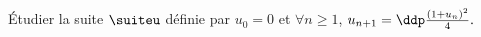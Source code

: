
\begin{exercice} \;
\'Etudier la suite $\suiteu$ d\'efinie par $u_0=0$ et $\forall n \geq 1$, $u_{n+1}=\ddp\frac{(1+u_n)^2}{4}.$
\end{exercice}